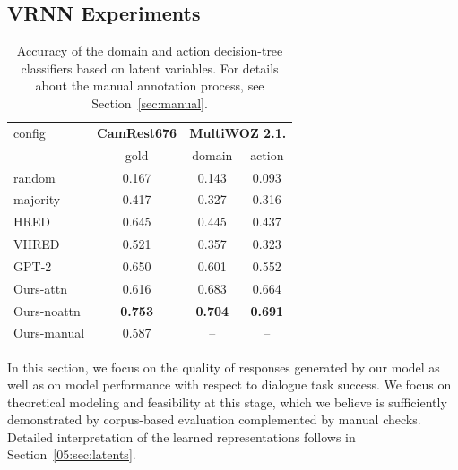 \subsection{VRNN Experiments}

\begin{table}[t]
    \centering\small
    \begin{tabular}{l|c|cc}
      \toprule
      config & \textbf{CamRest676} & \multicolumn{2}{c}{\textbf{MultiWOZ 2.1.}} \\
       & gold & domain & action \\
      \midrule
      random  & 0.167 & 0.143 & 0.093 \\
      majority &  0.417 & 0.327 & 0.316 \\\hdashline[0.5pt/2pt]
      HRED & 0.645 & 0.445 & 0.437 \\
      VHRED & 0.521 & 0.357 & 0.323 \\
      GPT-2 & 0.650 & 0.601 & 0.552 \\
      Ours-attn & 0.616 & 0.683 & 0.664 \\
      Ours-noattn & \textbf{0.753} &  \textbf{0.704} & \textbf{0.691} \\\hdashline[0.5pt/2pt]
      Ours-manual & 0.587 & -- & -- \\

      \bottomrule
  \end{tabular}
  \caption{Accuracy of the domain and action decision-tree classifiers based on latent variables. 
  For details about the manual annotation process, see Section~\ref{sec:manual}.}
  \label{tab:latent_classification}
\end{table}


In this section, we focus on the quality of responses generated by our model as well as on model performance with respect to dialogue task success.
We focus on theoretical modeling and feasibility at this stage, which we believe is sufficiently demonstrated by corpus-based evaluation complemented by manual checks. Detailed interpretation of the learned representations follows in Section~\ref{05:sec:latents}.

